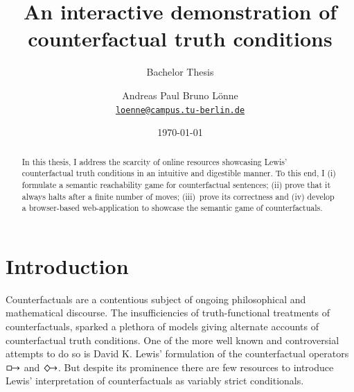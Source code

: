 \documentclass[a4paper,american,10pt]{paper}
\date{\today}
\providecommand*{\code}[1]{\texttt{#1}}
\theoremstyle{definition}\newtheorem{definition}{Definition}
\begin{document}
\title{An interactive demonstration of counterfactual truth conditions}

\subtitle{Bachelor Thesis}

\author{%
	Andreas Paul Bruno Lönne\\
	\code{\href{mailto:loenne@campus.tu-berlin.de}{loenne@campus.tu-berlin.de}}
}


\maketitle

\begin{abstract}
In this thesis, I address the scarcity of online resources showcasing Lewis' counterfactual truth conditions in an intuitive and digestible manner. To this end, I (i) formulate a semantic reachability game for counterfactual sentences; (ii) prove that it always halts after a finite number of moves; (iii)~prove its correctness and (iv) develop a browser-based web-application to showcase the semantic game of counterfactuals.
\end{abstract}
\section{Introduction}
Counterfactuals are a contentious subject of ongoing philosophical and mathematical discourse. The insufficiencies of truth-functional treatments of counterfactuals, sparked a plethora of models giving alternate accounts of counterfactual truth conditions. One of the more well known and controversial attempts to do so is David K. Lewis' formulation of the counterfactual operators $\boxright$ and $\Diamondright$. But despite its prominence there are few resources to introduce Lewis' interpretation of counterfactuals as variably strict conditionals.\\
\end{document}
